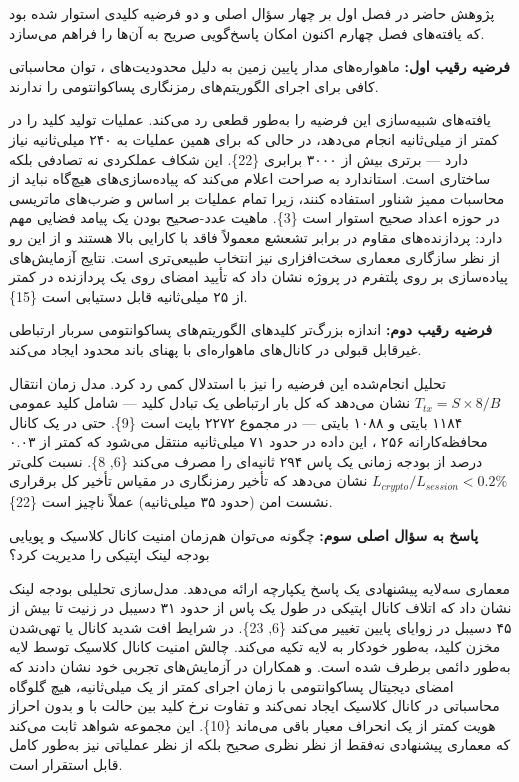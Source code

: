 \documentclass[a4paper,14pt]{extreport}
\begin{document}
پژوهش حاضر در فصل اول بر چهار سؤال اصلی و دو فرضیه کلیدی استوار شده بود که یافته‌های فصل چهارم اکنون امکان پاسخ‌گویی صریح به آن‌ها را فراهم می‌سازد.

\textbf{فرضیه رقیب اول:} ماهواره‌های مدار پایین زمین به دلیل محدودیت‌های ، توان محاسباتی کافی برای اجرای الگوریتم‌های رمزنگاری پساکوانتومی را ندارند.

یافته‌های شبیه‌سازی این فرضیه را به‌طور قطعی رد می‌کند.  عملیات تولید کلید را در کمتر از  میلی‌ثانیه انجام می‌دهد، در حالی که  برای همین عملیات به ۲۴۰ میلی‌ثانیه نیاز دارد --- برتری بیش از ۳۰۰۰ برابری \{22\}. این شکاف عملکردی نه تصادفی بلکه ساختاری است. استاندارد  به صراحت اعلام می‌کند که پیاده‌سازی‌های  هیچ‌گاه نباید از محاسبات ممیز شناور استفاده کنند، زیرا تمام عملیات بر اساس  و ضرب‌های ماتریسی در حوزه اعداد صحیح استوار است \{3\}. ماهیت عدد-صحیح بودن  یک پیامد فضایی مهم دارد: پردازنده‌های مقاوم در برابر تشعشع معمولاً فاقد  با کارایی بالا هستند و از این رو  از نظر سازگاری معماری سخت‌افزاری نیز انتخاب طبیعی‌تری است. نتایج آزمایش‌های پیاده‌سازی بر روی پلتفرم  در پروژه  نشان داد که تأیید امضای  روی یک پردازنده  در کمتر از ۲۵ میلی‌ثانیه قابل دستیابی است \{15\}.

\textbf{فرضیه رقیب دوم:} اندازه بزرگ‌تر کلیدهای الگوریتم‌های پساکوانتومی سربار ارتباطی غیرقابل قبولی در کانال‌های ماهواره‌ای با پهنای باند محدود ایجاد می‌کند.

تحلیل انجام‌شده این فرضیه را نیز با استدلال کمی رد کرد. مدل زمان انتقال $T_{tx} = S \times 8 / B$ نشان می‌دهد که کل بار ارتباطی یک تبادل کلید  --- شامل کلید عمومی ۱۱۸۴ بایتی و  ۱۰۸۸ بایتی --- در مجموع ۲۲۷۲ بایت است \{9\}. حتی در یک کانال محافظه‌کارانه ۲۵۶ ، این داده در حدود ۷۱ میلی‌ثانیه منتقل می‌شود که کمتر از ۰.۰۳ درصد از بودجه زمانی یک پاس ۲۹۴ ثانیه‌ای را مصرف می‌کند \{6, 8\}. نسبت کلی‌تر $L_{crypto}/L_{session} < 0.2\%$ نشان می‌دهد که تأخیر رمزنگاری  در مقیاس تأخیر کل برقراری نشست امن (حدود ۳۵ میلی‌ثانیه) عملاً ناچیز است \{22\}.

\textbf{پاسخ به سؤال اصلی سوم:} چگونه می‌توان هم‌زمان امنیت کانال کلاسیک  و پویایی بودجه لینک اپتیکی را مدیریت کرد؟

معماری سه‌لایه پیشنهادی یک پاسخ یکپارچه ارائه می‌دهد. مدل‌سازی تحلیلی بودجه لینک نشان داد که اتلاف کانال اپتیکی در طول یک پاس از حدود ۳۱ دسیبل در زنیت تا بیش از ۴۵ دسیبل در زوایای  پایین تغییر می‌کند \{6, 23\}. در شرایط افت شدید کانال یا تهی‌شدن مخزن کلید،  به‌طور خودکار به لایه  تکیه می‌کند. چالش امنیت کانال کلاسیک  توسط لایه  به‌طور دائمی برطرف شده است.  و همکاران در آزمایش‌های تجربی خود نشان دادند که امضای دیجیتال پساکوانتومی با زمان اجرای کمتر از یک میلی‌ثانیه، هیچ گلوگاه محاسباتی در کانال کلاسیک  ایجاد نمی‌کند و تفاوت نرخ کلید  بین حالت با و بدون احراز هویت  کمتر از یک انحراف معیار باقی می‌ماند \{10\}. این مجموعه شواهد ثابت می‌کند که معماری پیشنهادی نه‌فقط از نظر نظری صحیح بلکه از نظر عملیاتی نیز به‌طور کامل قابل استقرار است.
\end{document}
